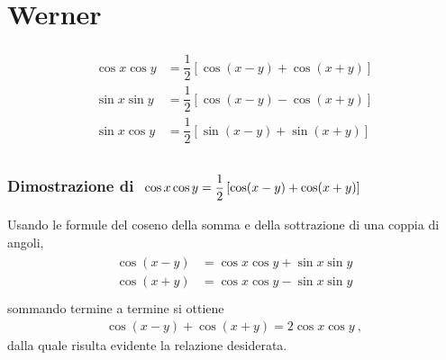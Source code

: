 \documentclass[letterpaper,10pt,italian]{jupyterBook}
\begin{document}
\section{Werner}
\label{\detokenize{ch/trigonometry:werner}}\begin{equation*}
\begin{split}\begin{aligned}
  \cos x \cos y & = \dfrac{1}{2} \left[ \cos( x - y ) + \cos ( x + y ) \right] \\
  \sin x \sin y & = \dfrac{1}{2} \left[ \cos( x - y ) - \cos ( x + y ) \right] \\
  \sin x \cos y & = \dfrac{1}{2} \left[ \sin( x - y ) + \sin ( x + y ) \right] \\
\end{aligned}\end{split}
\end{equation*}\subsubsection*{Dimostrazione di \protect\(\ \cos x \cos y = \dfrac{1}{2} \left[ \cos( x - y ) + \cos ( x + y ) \right]\protect\)}

\sphinxAtStartPar
Usando le formule del coseno della somma e della sottrazione di una coppia di angoli,
\begin{equation*}
\begin{split}\begin{aligned}
  \cos( x - y ) & = \cos x \cos y + \sin x \sin y \\
  \cos( x + y ) & = \cos x \cos y - \sin x \sin y \\
\end{aligned}\end{split}
\end{equation*}
\sphinxAtStartPar
sommando termine a termine si ottiene
\begin{equation*}
\begin{split}\cos (x - y) + \cos( x + y ) = 2 \cos x \cos y \ ,\end{split}
\end{equation*}
\sphinxAtStartPar
dalla quale risulta evidente la relazione desiderata.
\end{document}
